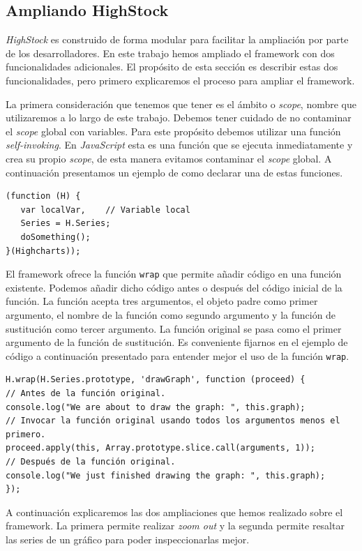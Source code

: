 	\subsection{Ampliando HighStock}
		\emph{HighStock} es construido de forma modular para facilitar la ampliación por parte de los desarrolladores. En este trabajo hemos ampliado
		el framework con dos funcionalidades adicionales. El propósito de esta sección es describir estas dos funcionalidades, pero primero
		explicaremos el proceso para ampliar el framework.
		\par
		La primera consideración que tenemos que tener es el ámbito o \emph{scope}, nombre que utilizaremos a lo largo de este trabajo.
		Debemos tener cuidado de no contaminar el \emph{scope} global con variables. Para este propósito debemos utilizar una función
		\emph{self-invoking}. En \emph{JavaScript} esta es una función que se ejecuta inmediatamente y crea su propio \emph{scope}, de esta manera
		evitamos contaminar el \emph{scope} global. A continuación presentamos un ejemplo de como declarar una de estas funciones.
		\begin{lstlisting}[style=myJs]
(function (H) {
   var localVar,	// Variable local
   Series = H.Series;
   doSomething();
}(Highcharts));
		\end{lstlisting}
		\par
		El framework ofrece la función \texttt{wrap} que permite añadir código en una función existente. Podemos añadir dicho código antes o
		después del código inicial de la función. La función acepta tres argumentos, el objeto padre como primer argumento, el nombre de la
		función como segundo argumento y la función de sustitución como tercer argumento. La función original se pasa como el primer
		argumento de la función de sustitución. Es conveniente fijarnos en el ejemplo de código a continuación presentado para entender mejor
		el uso de la función \texttt{wrap}.
		\enlargethispage{-1\baselineskip}
		\begin{lstlisting}[style=myJs]
H.wrap(H.Series.prototype, 'drawGraph', function (proceed) {
// Antes de la función original.
console.log("We are about to draw the graph: ", this.graph);
// Invocar la función original usando todos los argumentos menos el primero.
proceed.apply(this, Array.prototype.slice.call(arguments, 1));
// Después de la función original.
console.log("We just finished drawing the graph: ", this.graph);
});
		\end{lstlisting}
		\par  
		A continuación explicaremos las dos ampliaciones que hemos realizado sobre el framework. La primera permite realizar \emph{zoom out} y la
		segunda permite resaltar las series de un gráfico para poder inspeccionarlas mejor.
